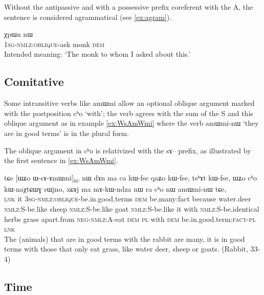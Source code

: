 \documentclass[oldfontcommands,oneside,a4paper,11pt]{article}
\newcommand{\ipa}[1]{{\phon #1}} %
\newcommand{\topic}{\textsc{dem}}
\newcommand{\rc}{\textsubscript{\textsc{rc}}}
\begin{document}
Without the antipassive and with a possessive prefix coreferent with the A, the sentence is considered agrammatical (see \ref{ex:agram}).

\begin{exe}
\ex \label{ex:agram}
\gll *\ipa{a-sɤ-tʰu}  	\ipa{χpɯn}  	\ipa{nɯ}  	  \\
\textsc{1sg-nmlz:oblique}-ask monk \topic{}   \\
\glt Intended meaning: `The monk   to whom I asked about this.'
\end{exe} 


\subsection{Comitative} \label{sec:rel:comitative}
Some intransitive verbs like \ipa{amɯmi}  allow an optional oblique argument marked with the postposition \ipa{cʰo} `with'; the verb agrees with the sum of the S and this oblique argument as in example \ref{ex:WsAmWmi} where the verb 	\ipa{amɯmi-nɯ}  `they are in good terms' is in the plural form.
 

The oblique argument in \ipa{cʰo} is relativized with the \ipa{sɤ}-- prefix, as illustrated by the first sentence in \ref{ex:WsAmWmi}.
\begin{exe}
   \ex \label{ex:WsAmWmi}
 \gll 
\ipa{tɕe}   	[\ipa{ɯʑo}   	\ipa{ɯ-sɤ-ɤmɯmi}]\rc{}   	\ipa{nɯ}   	\ipa{dɤn}   	\ipa{ma}   	\ipa{ca}   	\ipa{kɯ-fse}   	\ipa{qaʑo}   	\ipa{kɯ-fse,}   	\ipa{tsʰɤt}   	\ipa{kɯ-fse,}   	 \ipa{ɯʑo}   	\ipa{cʰo}   	\ipa{kɯ-naχtɕɯɣ}   	\ipa{sɯjno,}   	\ipa{xɕɤj}   	\ipa{ma}   	\ipa{mɤ-kɯ-ndza}   	\ipa{nɯ} \ipa{ra}   	\ipa{cʰo}   	\ipa{nɯ}   	\ipa{amɯmi-nɯ}   	\ipa{tɕe,}   \\
\textsc{lnk} it \textsc{3sg-nmlz:oblique}-be.in.good.terms \topic{} be.many:{fact} because water.deer \textsc{nmlz:S}-be.like sheep \textsc{nmlz:S}-be.like goat  \textsc{nmlz:S}-be.like it with  \textsc{nmlz:S}-be.identical herbs grass apart.from \textsc{neg-nmlz:A}-eat \textsc{dem} \textsc{pl} with \textsc{dem} be.in.good.term:\textsc{fact}-\textsc{pl} \textsc{lnk} \\
\glt The (animals) that are in good terms with the rabbit are many, it is in good terms with those that only eat grass, like water deer, sheep or goats. (Rabbit, 33-4)
\end{exe}

\subsection{Time} \label{sec:rel:time}
\end{document}
